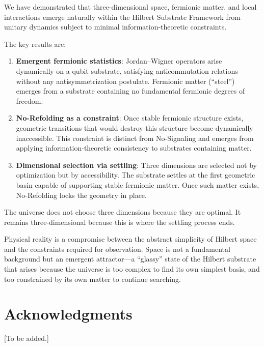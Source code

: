 \documentclass[11pt]{article}
\begin{document}
We have demonstrated that three-dimensional space, fermionic matter, and local interactions emerge naturally within the Hilbert Substrate Framework from unitary dynamics subject to minimal information-theoretic constraints.

The key results are:

\begin{enumerate}
\item \textbf{Emergent fermionic statistics}: Jordan--Wigner operators arise dynamically on a qubit substrate, satisfying anticommutation relations without any antisymmetrization postulate. Fermionic matter (``steel'') emerges from a substrate containing no fundamental fermionic degrees of freedom.

\item \textbf{No-Refolding as a constraint}: Once stable fermionic structure exists, geometric transitions that would destroy this structure become dynamically inaccessible. This constraint is distinct from No-Signaling and emerges from applying information-theoretic consistency to substrates containing matter.

\item \textbf{Dimensional selection via settling}: Three dimensions are selected not by optimization but by accessibility. The substrate settles at the first geometric basin capable of supporting stable fermionic matter. Once such matter exists, No-Refolding locks the geometry in place.
\end{enumerate}

The universe does not choose three dimensions because they are optimal. It remains three-dimensional because this is where the settling process ends.

Physical reality is a compromise between the abstract simplicity of Hilbert space and the constraints required for observation. Space is not a fundamental background but an emergent attractor---a ``glassy'' state of the Hilbert substrate that arises because the universe is too complex to find its own simplest basis, and too constrained by its own matter to continue searching.

\section*{Acknowledgments}

[To be added.]
\end{document}
